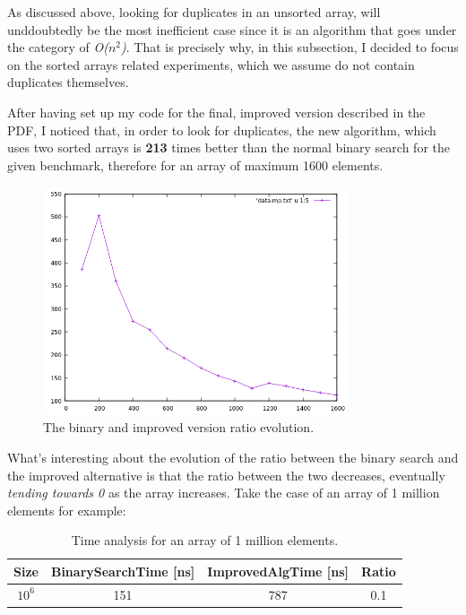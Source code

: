 \documentclass[a4paper,11pt]{article}
\begin{document}
As discussed above, looking for duplicates in an unsorted array, will unddoubtedly be the most inefficient case  since it is an 
algorithm that goes under the category of \textit{O($n^2$)}.
That is precisely why, in this subsection, I decided to focus on the sorted arrays related experiments, which we assume do 
not contain duplicates themselves.

After having set up my code for the final, improved version described in the PDF, I noticed that, in order to look for duplicates,
the new algorithm, which uses two sorted arrays is \textbf{213} times better than the normal binary search for the given benchmark, therefore for an array
of maximum 1600 elements. \newpage

\begin{figure}[ht]
    \centering
    \includegraphics[width=0.8\textwidth]{plot_improved alg.png}
    \caption{The binary and improved version ratio evolution.}
    \label{fig:3}
\end{figure}

What's interesting about the evolution of the 
ratio between the binary search and the improved alternative
is that the ratio between the two
decreases, eventually \textit{tending towards 0} as the array increases. Take the case of an array of 1 million elements for example:

\begin{table}[h!]
    \centering
    \begin{tabular}{||c c c c||} 
    \hline\hline\newline
    Size & BinarySearchTime [ns] & ImprovedAlgTime [ns] & Ratio\\ [0.5ex]
    \hline
    $10^6$ & 151 & 787 & 0.1\\[1ex] 
    \hline
    \end{tabular}
    \caption{Time analysis for an array of 1 million elements.} 
    \label{table:3}
\end{table}
\end{document}
